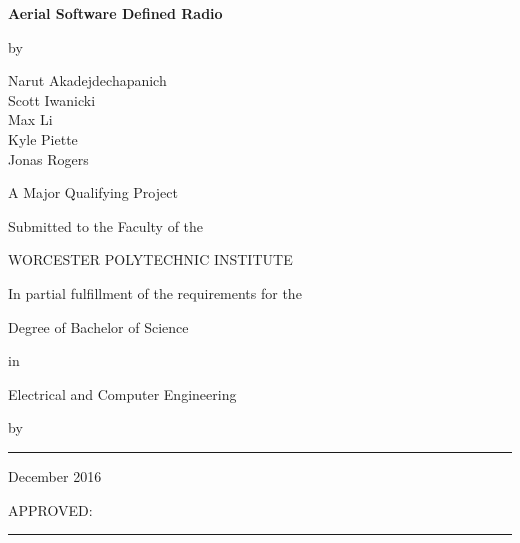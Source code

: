 \documentclass[12pt]{report}
\begin{document}
	
	
	
	\newcommand{\brk}{\vspace*{0.18in}}
	
	\thispagestyle{empty}
	
	\begin{center}
		
		\brk
		
		
		{\large 
			\textbf{
				Aerial Software Defined Radio
			}
		}
		
		
		\brk
		by
		
		\brk
		Narut Akadejdechapanich\\Scott Iwanicki\\Max Li\\Kyle Piette\\Jonas Rogers
		
		\brk\brk
		A Major Qualifying Project
		
		\brk
		Submitted to the Faculty of the 
		
		\brk
		WORCESTER POLYTECHNIC INSTITUTE
		
		\brk
		In partial fulfillment of the requirements for the
		
		\brk
		Degree of Bachelor of Science
		
		\brk
		in
		
		\brk
		Electrical and Computer Engineering
		
		\brk
		by
		
		\brk\brk
		\rule{3in}{1.2pt}
		
		\brk
		December 2016
		
	\end{center}
	
	
	\vfill
	APPROVED:
	
	\vspace{0.5in}
	\rule{3in}{0.8pt}
	
\end{document}
